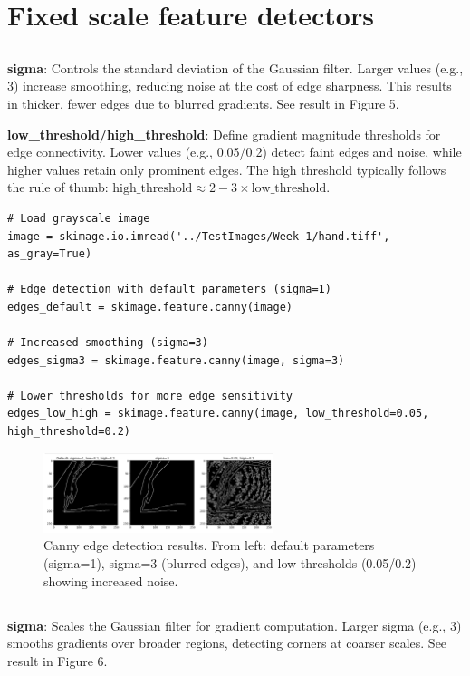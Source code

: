 \documentclass[12pt]{article}
\begin{document}
\section{Fixed scale feature detectors}
\subsection{}

\textbf{sigma}: Controls the standard deviation of the Gaussian filter. Larger values (e.g., 3) increase smoothing, reducing noise at the cost of edge sharpness. This results in thicker, fewer edges due to blurred gradients. See result in Figure 5.

\textbf{low\_threshold/high\_threshold}: Define gradient magnitude thresholds for edge connectivity. Lower values (e.g., 0.05/0.2) detect faint edges and noise, while higher values retain only prominent edges. The high threshold typically follows the rule of thumb: \( \text{high\_threshold} \approx 2-3 \times \text{low\_threshold} \).

\begin{lstlisting}
# Load grayscale image
image = skimage.io.imread('../TestImages/Week 1/hand.tiff', as_gray=True)

# Edge detection with default parameters (sigma=1)
edges_default = skimage.feature.canny(image)

# Increased smoothing (sigma=3)
edges_sigma3 = skimage.feature.canny(image, sigma=3)

# Lower thresholds for more edge sensitivity
edges_low_high = skimage.feature.canny(image, low_threshold=0.05, high_threshold=0.2)
\end{lstlisting}

\begin{figure}[h]
    \centering
    \includegraphics[width=0.6\textwidth]{pics/a5-3.1} 
    \caption{Canny edge detection results. From left: default parameters (sigma=1), sigma=3 (blurred edges), and low thresholds (0.05/0.2) showing increased noise.}
\end{figure}

\subsection{}
\textbf{sigma}: Scales the Gaussian filter for gradient computation. Larger sigma (e.g., 3) smooths gradients over broader regions, detecting corners at coarser scales. See result in Figure 6.
\end{document}

